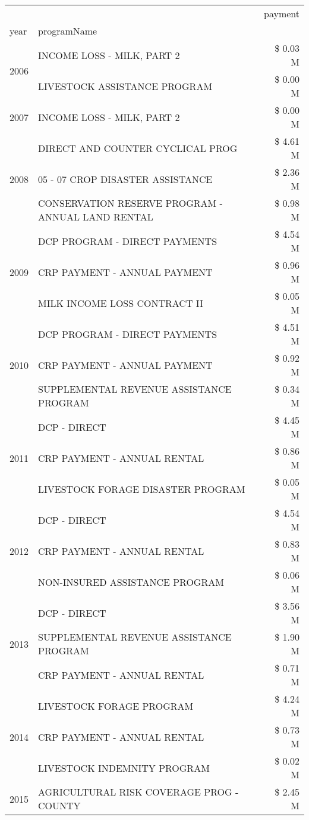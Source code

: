 \begin{tabular}{llr}
\toprule
 &  & payment \\
year & programName &  \\
\midrule
\multirow[t]{2}{*}{2006} & INCOME LOSS - MILK, PART 2 & \$ 0.03 M \\
 & LIVESTOCK ASSISTANCE PROGRAM & \$ 0.00 M \\
\cline{1-3}
2007 & INCOME LOSS - MILK, PART 2 & \$ 0.00 M \\
\cline{1-3}
\multirow[t]{3}{*}{2008} & DIRECT AND COUNTER CYCLICAL PROG & \$ 4.61 M \\
 & 05 - 07 CROP DISASTER ASSISTANCE & \$ 2.36 M \\
 & CONSERVATION RESERVE PROGRAM - ANNUAL LAND RENTAL & \$ 0.98 M \\
\cline{1-3}
\multirow[t]{3}{*}{2009} & DCP PROGRAM - DIRECT PAYMENTS & \$ 4.54 M \\
 & CRP PAYMENT - ANNUAL PAYMENT & \$ 0.96 M \\
 & MILK INCOME LOSS CONTRACT II & \$ 0.05 M \\
\cline{1-3}
\multirow[t]{3}{*}{2010} & DCP PROGRAM - DIRECT PAYMENTS & \$ 4.51 M \\
 & CRP PAYMENT - ANNUAL PAYMENT & \$ 0.92 M \\
 & SUPPLEMENTAL REVENUE ASSISTANCE PROGRAM & \$ 0.34 M \\
\cline{1-3}
\multirow[t]{3}{*}{2011} & DCP - DIRECT & \$ 4.45 M \\
 & CRP PAYMENT - ANNUAL RENTAL & \$ 0.86 M \\
 & LIVESTOCK FORAGE DISASTER PROGRAM & \$ 0.05 M \\
\cline{1-3}
\multirow[t]{3}{*}{2012} & DCP - DIRECT & \$ 4.54 M \\
 & CRP PAYMENT - ANNUAL RENTAL & \$ 0.83 M \\
 & NON-INSURED ASSISTANCE PROGRAM & \$ 0.06 M \\
\cline{1-3}
\multirow[t]{3}{*}{2013} & DCP - DIRECT & \$ 3.56 M \\
 & SUPPLEMENTAL REVENUE ASSISTANCE PROGRAM & \$ 1.90 M \\
 & CRP PAYMENT - ANNUAL RENTAL & \$ 0.71 M \\
\cline{1-3}
\multirow[t]{3}{*}{2014} & LIVESTOCK FORAGE PROGRAM & \$ 4.24 M \\
 & CRP PAYMENT - ANNUAL RENTAL & \$ 0.73 M \\
 & LIVESTOCK INDEMNITY PROGRAM & \$ 0.02 M \\
\cline{1-3}
\multirow[t]{3}{*}{2015} & AGRICULTURAL RISK COVERAGE PROG - COUNTY & \$ 2.45 M \\

\end{tabular}
